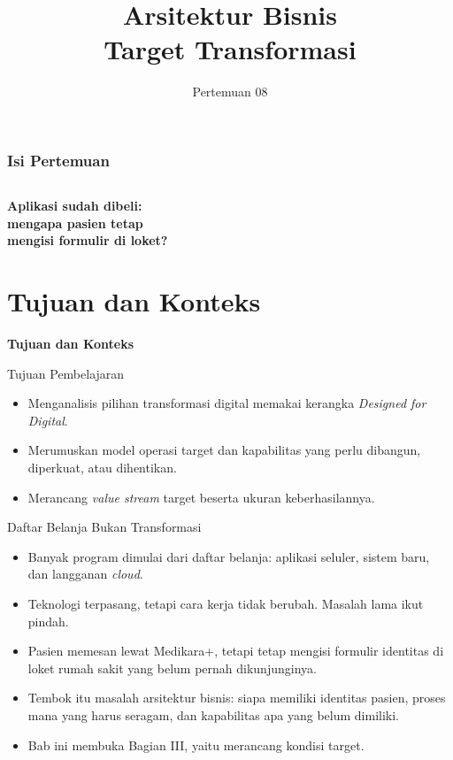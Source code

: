 \documentclass[aspectratio=169, table, 12pt]{beamer}
\title{\Huge Arsitektur Bisnis\\ \vspace{10pt} Target Transformasi}
\date{Pertemuan 08}
\begin{document}
\frame{\titlepage}

\begin{frame}
  \frametitle{Isi Pertemuan}
  \vspace{14pt}
  \begin{columns}[t]
    {\small\tableofcontents[sections={1-3}]}

    {\small\tableofcontents[sections={4-6}]}
  \end{columns}
\end{frame}

\begin{frame}{\hfill}
  \centering
  \Huge{\textbf{Aplikasi sudah dibeli:\\mengapa pasien tetap\\mengisi formulir di loket?}}
\end{frame}

\section{Tujuan dan Konteks}

\begin{frame}{\hfill}
  \centering
  \Huge{\textbf{Tujuan dan Konteks}}
\end{frame}

\begin{frame}{{\Large Tujuan Pembelajaran}}
  \vspace{10pt}
  \begin{itemize}
    \item Menganalisis pilihan transformasi digital memakai kerangka \textit{Designed for Digital}.
    \item Merumuskan model operasi target dan kapabilitas yang perlu dibangun, diperkuat, atau dihentikan.
    \item Merancang \textit{value stream} target beserta ukuran keberhasilannya.
  \end{itemize}
\end{frame}

\begin{frame}{{\Large Daftar Belanja Bukan Transformasi}}
  \vspace{6pt}
  \small
  \begin{itemize}
    \item Banyak program dimulai dari daftar belanja: aplikasi seluler, sistem baru, dan langganan
          \textit{cloud}.
    \item Teknologi terpasang, tetapi cara kerja tidak berubah. Masalah lama ikut pindah.
    \item Pasien memesan lewat Medikara+, tetapi tetap mengisi formulir identitas di loket rumah sakit
          yang belum pernah dikunjunginya.
    \item Tembok itu masalah arsitektur bisnis: siapa memiliki identitas pasien, proses mana yang harus
          seragam, dan kapabilitas apa yang belum dimiliki.
    \item Bab ini membuka Bagian III, yaitu merancang kondisi target.
  \end{itemize}
\end{frame}
\end{document}
